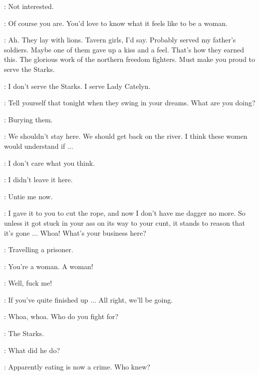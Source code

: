 \BRIENNE: Not interested. 

\JAIME: Of course you are. You'd love to know what it feels like to be a woman.


\JAIME: Ah. They lay with lions. Tavern girls, I'd say. Probably served my father's soldiers. Maybe one of them gave up a kiss and a feel. That's how they earned this. The glorious work of the northern freedom fighters. Must make you proud to serve the Starks. 

\BRIENNE: I don't serve the Starks. I serve Lady Catelyn. 

\JAIME: Tell yourself that tonight when they swing in your dreams. What are you doing? 


\BRIENNE: Burying them. 

\JAIME: We shouldn't stay here. We should get back on the river. I think these women would understand if $\ldots$  

\BRIENNE:  I don't care what you think. 

\STARKSOLDIERa:  I didn't leave it here. 

\JAIME:  Untie me now. 

\STARKSOLDIERa:  I gave it to you to cut the rope, and now I don't have me dagger no more. So unless it got stuck in your ass on its way to your cunt, it stands to reason that it's gone $\ldots$  Whoa! What's your business here? 

\BRIENNE: Travelling a prisoner. 

\STARKSOLDIERa:  You're a woman. A woman!

\STARKSOLDIERb: Well, fuck me! 

\BRIENNE: If you've quite finished up $\ldots$  All right, we'll be going.  

\STARKSOLDIERa: Whoa, whoa. Who do you fight for? 

\BRIENNE: The Starks.  

\STARKSOLDIERb: What did he do? 

\JAIME:  Apparently eating is now a crime. Who knew? 

